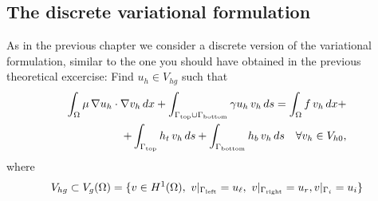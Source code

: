 \subsection*{The discrete variational formulation}

As in the previous chapter we consider a discrete version of the variational formulation,
similar to the one you should have obtained in the previous theoretical excercise:
Find ${u}_h \in V_{hg}$ such that
\begin{eqnarray}
\int_{\Omega} {\mu \, \nabla{u}_h \cdot \nabla{v }_h} \, d{x} +
\int_{\Gamma_{\mbox{\tiny top}} \cup \Gamma_{\mbox{\tiny bottom}}}{\gamma u_h\,v_h}\,ds = \int_{\Omega} { {f} \, {v}_h} \, dx + \nonumber \\
~~~~~+\int_{\Gamma_{\mbox{\tiny top}}}{h_t\,v_h}\,ds +
\int_{\Gamma_{\mbox{\tiny bottom}}}{h_b\,v_h}\,ds ~~~\forall {v}_h\in V_{h0},
\end{eqnarray}
where
\begin{equation}
V_{hg} \subset V_g(\Omega) = \{v \in H^1(\Omega),~
v|_{\Gamma_{\mbox{\tiny left}}} = u_{\ell},~v|_{\Gamma_{\mbox{\tiny right}}} = u_{r}, v|_{\Gamma_{i}} = u_i \}\nonumber
\end{equation}

